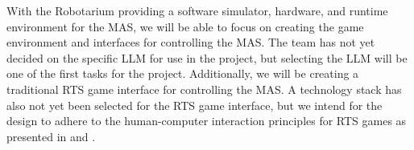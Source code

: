 With the Robotarium providing a software simulator, hardware, and runtime environment for the MAS, we will be able to focus on creating the game environment and interfaces for controlling the MAS.  The team has not yet decided on the specific LLM for use in the project, but selecting the LLM will be one of the first tasks for the project.  Additionally, we will be creating a traditional RTS game interface for controlling the MAS.  A technology stack has also not yet been selected for the RTS game interface, but we intend for the design to adhere to the human-computer interaction principles for RTS games as presented in \cite{wenjun_hci_2006} and \cite{riaz_user_2021}.
